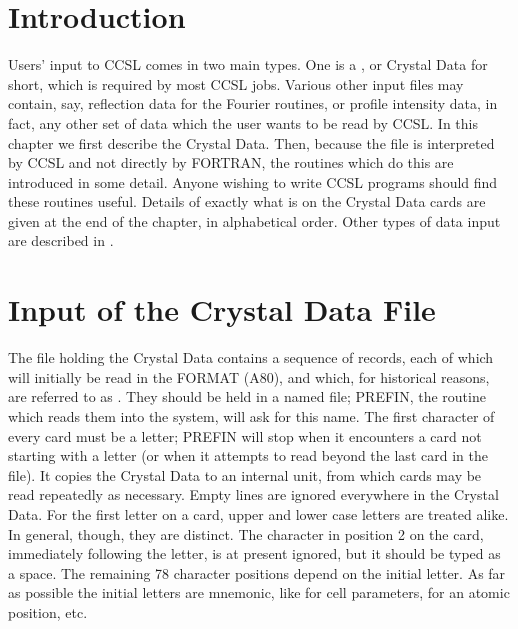 %
%
\label{chap:3}
\section{Introduction}
Users' input to CCSL comes in two main types.  One is a
, or Crystal Data for short, which is
required by most CCSL jobs.  Various other input files may contain,
say, reflection data for the Fourier routines, or profile intensity data,
in fact, any other set of data which the user wants to be read by
CCSL.
\p 
In this chapter we first describe the Crystal Data. Then, because the file
is interpreted by CCSL and not directly by FORTRAN, the
routines which do this are introduced in some detail.  Anyone wishing to
write CCSL programs should find these routines
useful.  Details of exactly what is on the Crystal Data cards are given at the
end of the chapter, in alphabetical order.
\p 
Other types of data input are described in .
\p
\section{Input of the Crystal Data File}
The file holding the Crystal Data contains a sequence of records, each 
of which will
initially be read in the FORMAT (A80), and which, for historical reasons, are
referred to as .  They should be held in a named
file; PREFIN, the routine which reads
them into the system, will ask for this name.
\p 
The first character of every card must be a letter;  PREFIN 
will stop when it encounters a
card not starting with a letter (or when it attempts to read beyond the
last card in the file). It copies the Crystal Data to an internal
unit, from which cards may be read repeatedly as necessary. Empty lines are
ignored everywhere in the Crystal Data.
\p 
For the first letter on a card, upper and lower case letters are treated
alike. In general, though, they are distinct.  The character in position
2 on the card, immediately following the letter, is at present ignored,
but it should be typed as a space.
\p 
The remaining 78 character positions depend on the initial letter. As
far as possible the initial letters are mnemonic, like 
for cell parameters,  for an atomic position, etc.  
\p 
